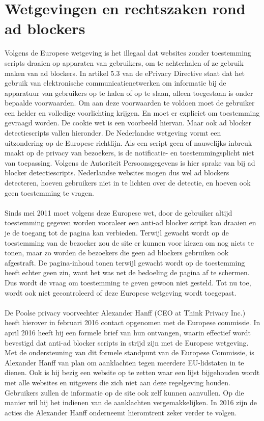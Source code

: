 \documentclass[pdftex,a4paper,12pt,twoside]{report}
\begin{document}
\chapter{Wetgevingen en rechtszaken rond ad blockers}
\label{ch: Wetgevingen en rechtzaken rond ad blockers}

Volgens de Europese wetgeving is het illegaal dat websites zonder toestemming scripts draaien op apparaten van gebruikers, om te achterhalen of ze gebruik maken van ad blockers. 
In artikel 5.3 van de ePrivacy Directive staat dat het gebruik van elektronische communicatienetwerken om informatie bij de apparatuur van gebruikers op te halen of op te slaan, alleen toegestaan is onder bepaalde voorwaarden. Om aan deze voorwaarden te voldoen moet de gebruiker een helder en volledige voorlichting krijgen. En moet er expliciet om toestemming gevraagd worden. De cookie wet is een voorbeeld hiervan. Maar ook ad blocker detectiescripts vallen hieronder. De Nederlandse wetgeving vormt een uitzondering op de Europese richtlijn. Als een script geen of nauwelijks inbreuk maakt op de privacy van bezoekers, is de notificatie- en toestemmingsplicht niet van toepassing. Volgens de Autoriteit Persoonsgegevens is hier sprake van bij ad blocker detectiescripts. Nederlandse websites mogen dus wel ad blockers detecteren, hoeven gebruikers niet in te lichten over de detectie, en hoeven ook geen toestemming te vragen. 
\\
\\
Sinds mei 2011 moet volgens deze Europese wet, door de gebruiker altijd toestemming gegeven worden vooraleer een anti-ad blocker script kan draaien en je de toegang tot de pagina kan verbieden. Terwijl gewacht wordt op de toestemming van de bezoeker zou de site er kunnen voor kiezen om nog niets te tonen, maar zo worden de bezoekers die geen ad blockers gebruiken ook afgestraft. De pagina-inhoud tonen terwijl gewacht wordt op de toestemming heeft echter geen zin, want het was net de bedoeling de pagina af te schermen. Dus wordt de vraag om toestemming te geven gewoon niet gesteld. Tot nu toe, wordt ook niet gecontroleerd of deze Europese wetgeving wordt toegepast.
\\
\\
De Poolse privacy voorvechter Alexander Hanff (CEO at Think Privacy Inc.) heeft hierover in februari 2016 contact opgenomen met de Europese commissie. In april 2016 heeft hij een formele brief van hun ontvangen, waarin effectief wordt bevestigd dat anti-ad blocker scripts in strijd zijn met de Europese wetgeving. 
Met de ondersteuning van dit formele standpunt van de Europese Commissie, is Alexander Hanff van plan om aanklachten tegen meerdere EU-lidstaten in te dienen. Ook is hij bezig een website op te zetten waar een lijst bijgehouden wordt met alle websites en uitgevers die zich niet aan deze regelgeving houden. Gebruikers zullen de informatie op de site ook zelf kunnen aanvullen. Op die manier wil hij het indienen van de aanklachten vergemakkelijken.
In 2016 zijn de acties die Alexander Hanff onderneemt hieromtrent zeker verder te volgen.
\end{document}
